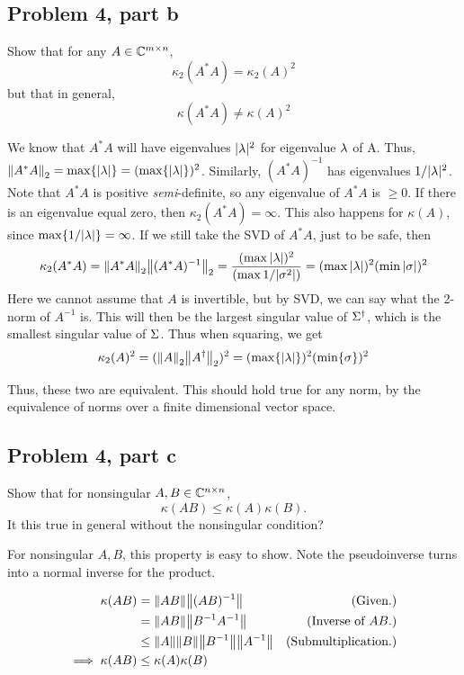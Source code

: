 \subsection{Problem 4, part b}
Show that for any $A \in \mathbb{C}^{m\times n}$,
\[
    \kappa_2(A^*A) = \kappa_2(A)^2
\]
but that in general,
\[
    \kappa(A^*A)\neq \kappa(A)^2
\]
\partbreak
\begin{solution}

We know that $A^*A$ will have eigenvalues $|\lambda|^2$ for eigenvalue $\lambda$ of A. Thus, $\norm{A^*A}_2 = \max \{ |\lambda|\} = (\max \{ |\lambda | \})^2$. Similarly, $(A^*A)^{-1}$ has eigenvalues $1/|\lambda|^2$. Note that $A^*A$ is positive \textit{semi}-definite, so any eigenvalue of $A^*A$ is $\geq 0$. If there is an eigenvalue equal zero, then $\kappa_2(A^*A) = \infty$. This also happens for $\kappa(A)$, since $\max \{ 1/|\lambda|\} = \infty$. If we still take the SVD of $A^*A$, just to be safe, then 
\[
\kappa_2(A^*A) = \norm{A^*A}_2\norm{(A^*A)^{-1}}_2 = \frac{(\max{|\lambda|})^2}{(\max{1/|\sigma^2|})} = (\max{|\lambda|})^2 (\min{|\sigma|})^2
\]
Here we cannot assume that $A$ is invertible, but by SVD, we can say what the 2-norm of $A^{-1}$ is. This will then be the largest singular value of $\Sigma ^\dag$, which is the smallest singular value of $\Sigma$. Thus when squaring, we get
\[
\kappa_2(A)^2 = (\norm{A}_2\norm{A^\dag}_2)^2 = (\max\{|\lambda|\})^2(\min \{ \sigma \} )^2
\]

Thus, these two are equivalent. This should hold true for any norm, by the equivalence of norms over a finite dimensional vector space.  
\end{solution}

\newpage
\subsection{Problem 4, part c}
Show that for nonsingular $A, B \in \mathbb{C}^{n\times n}$, 
\[
\kappa(AB)\leq \kappa(A)\kappa(B).
\]
 It this true in general without the nonsingular condition?
 \partbreak
 \begin{solution}

     For nonsingular $A, B$, this property is easy to show. Note the pseudoinverse turns into a normal inverse for the product.

     \alignbreak
     \begin{align}
         \kappa(AB) &= \norm{AB}\norm{(AB)^{-1}} &\text{(Given.)}\nonumber\\
         &= \norm{AB} \norm{B^{-1}A^{-1}} &\text{(Inverse of $AB$.)}\nonumber\\
         &\leq \norm{A} \norm{B} \norm{B^{-1}} \norm{A^{-1}} &\text{(Submultiplication.)}\nonumber\\
         \implies \kappa(AB) &\leq \kappa(A)\kappa(B)\nonumber
     \end{align}
     \alignbreak
 \end{solution}

